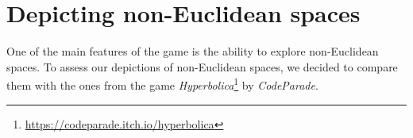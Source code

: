 \section{Depicting non-Euclidean spaces}
One of the main features of the game is the ability to explore non-Euclidean spaces.
To assess our depictions of non-Euclidean spaces, we decided to compare them with the ones from the game \textit{Hyperbolica}\footnote{\url{https://codeparade.itch.io/hyperbolica}} by \textit{CodeParade}.


